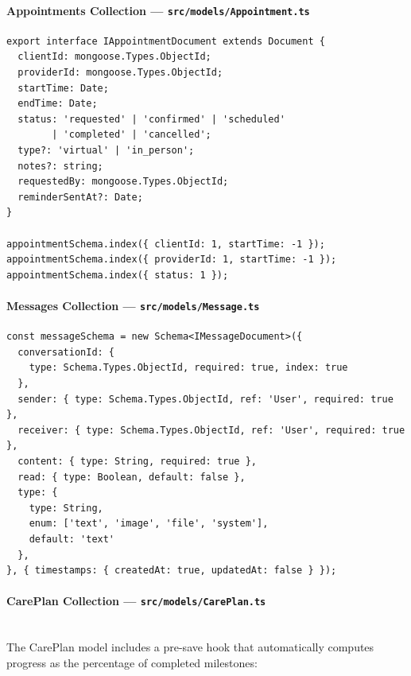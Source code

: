 \documentclass[12pt,letterpaper]{article}
\begin{document}
\paragraph{Appointments Collection --- \texttt{src/models/Appointment.ts}}

\begin{lstlisting}[caption={Appointment model (\texttt{Appointment.ts})}]
export interface IAppointmentDocument extends Document {
  clientId: mongoose.Types.ObjectId;
  providerId: mongoose.Types.ObjectId;
  startTime: Date;
  endTime: Date;
  status: 'requested' | 'confirmed' | 'scheduled'
        | 'completed' | 'cancelled';
  type?: 'virtual' | 'in_person';
  notes?: string;
  requestedBy: mongoose.Types.ObjectId;
  reminderSentAt?: Date;
}

appointmentSchema.index({ clientId: 1, startTime: -1 });
appointmentSchema.index({ providerId: 1, startTime: -1 });
appointmentSchema.index({ status: 1 });
\end{lstlisting}

\paragraph{Messages Collection --- \texttt{src/models/Message.ts}}

\begin{lstlisting}[caption={Message model (\texttt{Message.ts})}]
const messageSchema = new Schema<IMessageDocument>({
  conversationId: {
    type: Schema.Types.ObjectId, required: true, index: true
  },
  sender: { type: Schema.Types.ObjectId, ref: 'User', required: true },
  receiver: { type: Schema.Types.ObjectId, ref: 'User', required: true },
  content: { type: String, required: true },
  read: { type: Boolean, default: false },
  type: {
    type: String,
    enum: ['text', 'image', 'file', 'system'],
    default: 'text'
  },
}, { timestamps: { createdAt: true, updatedAt: false } });
\end{lstlisting}

\paragraph{CarePlan Collection --- \texttt{src/models/CarePlan.ts}}
\mbox{}\\
The CarePlan model includes a pre-save hook that automatically computes progress as the percentage of completed milestones:
\end{document}
